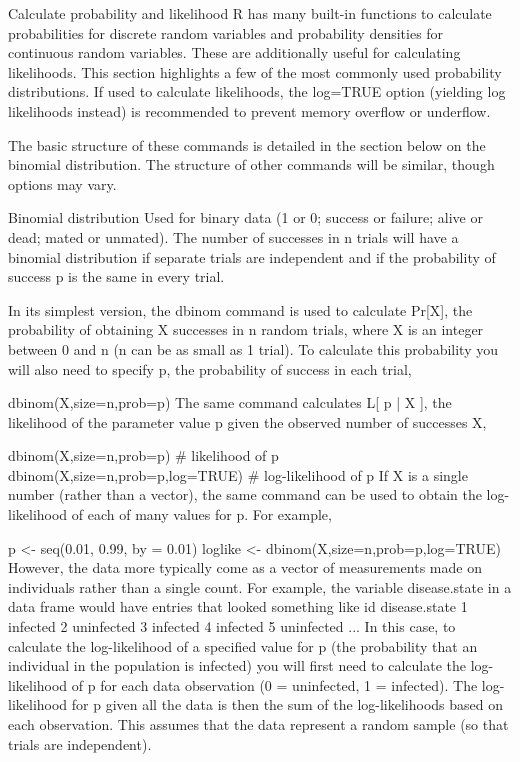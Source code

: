 Calculate probability and likelihood
R has many built-in functions to calculate probabilities for discrete random variables and probability densities for continuous random variables. These are additionally useful for calculating likelihoods. This section highlights a few of the most commonly used probability distributions. If used to calculate likelihoods, the log=TRUE option (yielding log likelihoods instead) is recommended to prevent memory overflow or underflow.

The basic structure of these commands is detailed in the section below on the binomial distribution. The structure of other commands will be similar, though options may vary.

Binomial distribution
Used for binary data (1 or 0; success or failure; alive or dead; mated or unmated). The number of successes in n trials will have a binomial distribution if separate trials are independent and if the probability of success p is the same in every trial.

In its simplest version, the dbinom command is used to calculate Pr[X], the probability of obtaining X successes in n random trials, where X is an integer between 0 and n (n can be as small as 1 trial). To calculate this probability you will also need to specify p, the probability of success in each trial,

dbinom(X,size=n,prob=p)
The same command calculates L[ p | X ], the likelihood of the parameter value p given the observed number of successes X,

dbinom(X,size=n,prob=p)           # likelihood of p
dbinom(X,size=n,prob=p,log=TRUE)  # log-likelihood of p
If X is a single number (rather than a vector), the same command can be used to obtain the log-likelihood of each of many values for p. For example,

p <- seq(0.01, 0.99, by = 0.01)
loglike <- dbinom(X,size=n,prob=p,log=TRUE)
However, the data more typically come as a vector of measurements made on individuals rather than a single count. For example, the variable disease.state in a data frame would have entries that looked something like
id disease.state
1 infected
2 uninfected
3 infected
4 infected
5 uninfected
...
In this case, to calculate the log-likelihood of a specified value for p (the probability that an individual in the population is infected) you will first need to calculate the log-likelihood of p for each data observation (0 = uninfected, 1 = infected). The log-likelihood for p given all the data is then the sum of the log-likelihoods based on each observation. This assumes that the data represent a random sample (so that trials are independent).


